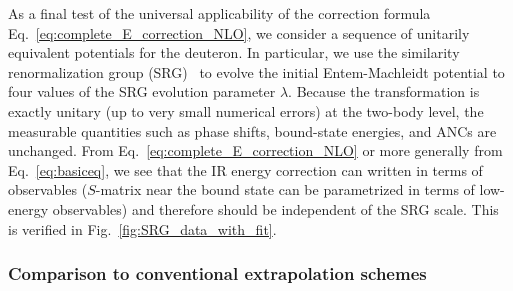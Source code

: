 	As a final test of the universal applicability of the correction
	formula Eq.~\eqref{eq:complete_E_correction_NLO}, we consider a sequence
	of unitarily equivalent	potentials for the deuteron.  In particular,
	we use the similarity renormalization group (SRG)~\cite{Bogner:2009bt}
	to evolve the initial Entem-Machleidt
	potential to four values of the SRG evolution parameter $\lambda$.
	Because the transformation is exactly unitary (up to very small
	numerical errors) at the two-body level, the measurable quantities
	such as phase shifts, bound-state energies, and ANCs are unchanged.
	From Eq.~\eqref{eq:complete_E_correction_NLO} or more generally from
	Eq.~\eqref{eq:basiceq}, we see that the IR energy correction can written
	in terms of observables ($S$-matrix near the bound state can be
	parametrized in terms of low-energy observables) and therefore should be
	independent of the SRG scale.  This is verified in
	Fig.~\ref{fig:SRG_data_with_fit}.

	\medskip
	\subsubsection{Comparison to conventional extrapolation schemes}

